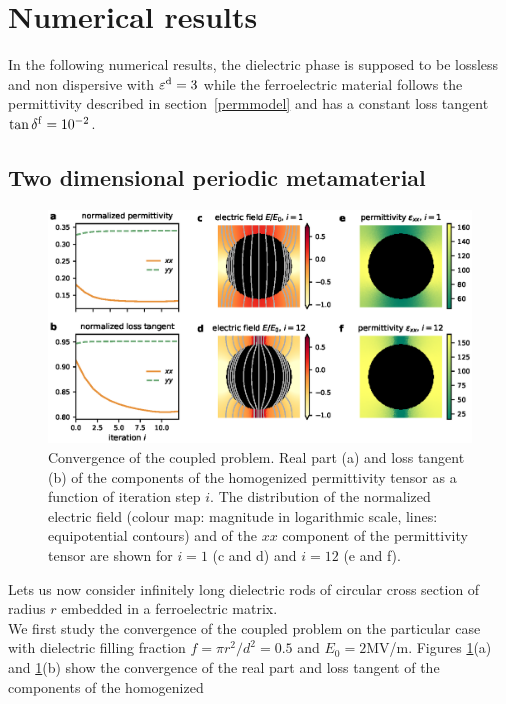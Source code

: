 \documentclass[openacc]{rsproca_new}%
\newcommand{\epsd}{\varepsilon^{\rm d}}
\begin{document}
\section{Numerical results}
In the following numerical results, the dielectric phase is supposed to be
lossless and non dispersive with $\epsd = 3$ while the ferroelectric material follows the
permittivity described in section~\ref{permmodel} and has a constant loss
tangent $\tan \delta^{\rm f} = 10^{-2}$.



\subsection{Two dimensional periodic metamaterial}
\begin{figure}[!t]
 \centering
 \includegraphics[width=1\textwidth]{convergence_per}
 \caption{Convergence of the coupled problem.
  Real part (a) and loss tangent (b) of the components of the homogenized
  permittivity tensor as a function of iteration step $i$. The distribution of
  the normalized electric field (colour map: magnitude in logarithmic scale,
  lines: equipotential contours) and of the
  $xx$ component of the permittivity tensor are shown for $i=1$
  (c and d) and $i=12$ (e and f).
 }
 \label{conv2D}
\end{figure}
Lets us now consider infinitely long dielectric rods of circular cross section
of radius $r$ embedded in a ferroelectric matrix.\\
We first study the convergence of the coupled problem on the particular case with dielectric
filling fraction $f=\pi r^2/d^2=0.5$ and $E_0=2$MV/m. Figures \ref{conv2D}(a) and \ref{conv2D}(b) show the
convergence of the real part and loss tangent of the components of the homogenized
\end{document}
